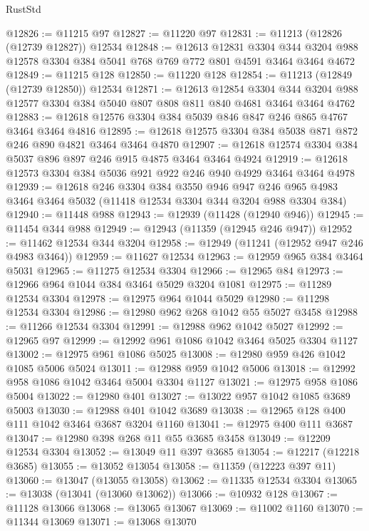 \begin{lexlean}{RustStd}
\begin{coremodule}
{{{{{{{{{{{{{{{{{{{@12826 := @11215 @97
@12827 := @11220 @97
@12831 := @11213 (@12826 (@12739 @12827)) @12534
@12848 := @12613
    @12831
    @3304
    @344
    @3204
    @988
    @12578
    @3304
    @384
    @5041
    @768
    @769
    @772
    @801
    @4591
    @3464
    @3464
    @4672
@12849 := @11215 @128
@12850 := @11220 @128
@12854 := @11213 (@12849 (@12739 @12850)) @12534
@12871 := @12613
    @12854
    @3304
    @344
    @3204
    @988
    @12577
    @3304
    @384
    @5040
    @807
    @808
    @811
    @840
    @4681
    @3464
    @3464
    @4762
@12883 := @12618 @12576 @3304 @384 @5039 @846 @847 @246 @865 @4767 @3464 @3464 @4816
@12895 := @12618 @12575 @3304 @384 @5038 @871 @872 @246 @890 @4821 @3464 @3464 @4870
@12907 := @12618 @12574 @3304 @384 @5037 @896 @897 @246 @915 @4875 @3464 @3464 @4924
@12919 := @12618 @12573 @3304 @384 @5036 @921 @922 @246 @940 @4929 @3464 @3464 @4978
@12939 := @12618
    @246
    @3304
    @384
    @3550
    @946
    @947
    @246
    @965
    @4983
    @3464
    @3464
    @5032
    (@11418 @12534 @3304 @344 @3204 @988 @3304 @384)
@12940 := @11448 @988
@12943 := @12939 (@11428 (@12940 @946))
@12945 := @11454 @344 @988
@12949 := @12943 (@11359 (@12945 @246 @947))
@12952 := @11462 @12534 @344 @3204
@12958 := @12949 (@11241 (@12952 @947 @246 @4983 @3464))
@12959 := @11627 @12534
@12963 := @12959 @965 @384 @3464 @5031
@12965 := @11275 @12534 @3304
@12966 := @12965 @84
@12973 := @12966 @964 @1044 @384 @3464 @5029 @3204 @1081
@12975 := @11289 @12534 @3304
@12978 := @12975 @964 @1044 @5029
@12980 := @11298 @12534 @3304
@12986 := @12980 @962 @268 @1042 @55 @5027 @3458
@12988 := @11266 @12534 @3304
@12991 := @12988 @962 @1042 @5027
@12992 := @12965 @97
@12999 := @12992 @961 @1086 @1042 @3464 @5025 @3304 @1127
@13002 := @12975 @961 @1086 @5025
@13008 := @12980 @959 @426 @1042 @1085 @5006 @5024
@13011 := @12988 @959 @1042 @5006
@13018 := @12992 @958 @1086 @1042 @3464 @5004 @3304 @1127
@13021 := @12975 @958 @1086 @5004
@13022 := @12980 @401
@13027 := @13022 @957 @1042 @1085 @3689 @5003
@13030 := @12988 @401 @1042 @3689
@13038 := @12965 @128 @400 @111 @1042 @3464 @3687 @3204 @1160
@13041 := @12975 @400 @111 @3687
@13047 := @12980 @398 @268 @11 @55 @3685 @3458
@13049 := @12209 @12534 @3304
@13052 := @13049 @11 @397 @3685
@13054 := @12217 (@12218 @3685)
@13055 := @13052 @13054
@13058 := @11359 (@12223 @397 @11)
@13060 := @13047 (@13055 @13058)
@13062 := @11335 @12534 @3304
@13065 := @13038 (@13041 (@13060 @13062))
@13066 := @10932 @128
@13067 := @11128 @13066
@13068 := @13065 @13067
@13069 := @11002 @1160
@13070 := @11344 @13069
@13071 := @13068 @13070
}}}}}}}}}}}}}}}}}}}
\end{coremodule}
\end{lexlean}
